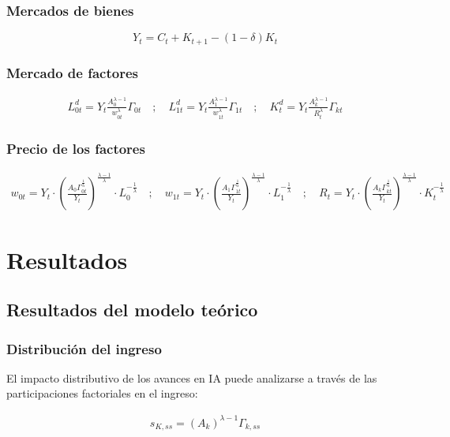 \documentclass{article}
\theoremstyle{remark}
\theoremstyle{definition}
\begin{document}
\subsubsection{Mercados de bienes}
$$Y_t=C_t + K_{t+1} - (1-\delta)K_t$$

\subsubsection{Mercado de factores}
\begin{align*}
    L_{0t}^d = Y_t \frac{A_0^{\lambda-1}}{w_{0t}^{\lambda}} \Gamma_{0t} \quad ; \quad
    L_{1t}^d = Y_t \frac{A_1^{\lambda-1}}{w_{1t}^{\lambda}} \Gamma_{1t} \quad ; \quad
    K_t^d =  Y_t \frac{A_k^{\lambda-1}}{R_t^{\lambda}} \Gamma_{kt}
\end{align*}

\subsubsection{Precio de los factores}

\begin{align*}
    w_{0t} = Y_t \cdot \left( \frac{A_0 \Gamma_{0t}^{\frac{1}{\lambda}}}{Y_t} \right)^{\frac{\lambda-1}{\lambda}} \cdot L_0^{-\frac{1}{\lambda}} \quad ;  \quad 
    w_{1t} = Y_t \cdot \left( \frac{A_1 \Gamma_{1t}^{\frac{1}{\lambda}}}{Y_t} \right)^{\frac{\lambda-1}{\lambda}} \cdot L_1^{-\frac{1}{\lambda}} \quad ; \quad
    R_t = Y_t \cdot \left( \frac{A_k \Gamma_{kt}^{\frac{1}{\lambda}}}{Y_t} \right)^{\frac{\lambda-1}{\lambda}} \cdot K_t^{-\frac{1}{\lambda}}
    \label{eq:retorno_capital}
\end{align*}

\section{Resultados}

\subsection{Resultados del modelo te\'orico}
\subsubsection{Distribuci\'on del ingreso}

El impacto distributivo de los avances en IA puede analizarse a través de las participaciones factoriales en el ingreso:

\begin{align*}
    s_{K,ss} = (A_k)^{\lambda-1} \Gamma_{k,ss}
\end{align*}
\end{document}
